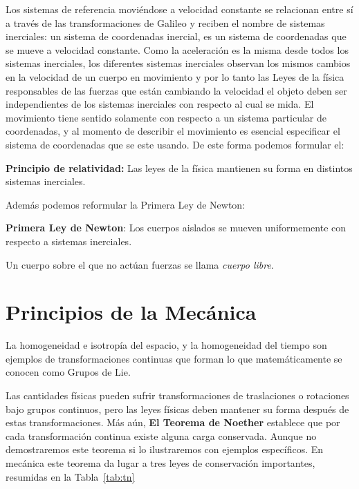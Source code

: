 Los sistemas de referencia moviéndose a velocidad constante se
relacionan entre sí a través de las transformaciones de Galileo y
reciben el nombre de sistemas inerciales: un sistema de coordenadas
inercial, es un sistema de coordenadas que se mueve a velocidad
constante.
Como la aceleración es la misma desde todos los sistemas inerciales,
los diferentes sistemas inerciales observan los mismos cambios en la
velocidad de un cuerpo en movimiento y por lo tanto las Leyes de la
física responsables de las fuerzas que están cambiando la velocidad el
objeto deben ser independientes de los sistemas inerciales con
respecto al cual se mida. 
El movimiento tiene sentido solamente con respecto a un sistema
particular de coordenadas, y al momento de describir el movimiento es
esencial especificar el sistema de coordenadas que se este usando. De
este forma podemos formular el:

\textbf{Principio de relatividad:} Las leyes de la física mantienen su forma en distintos sistemas inerciales.

Además podemos reformular la Primera Ley de Newton:

\textbf{Primera Ley de Newton}: Los cuerpos aislados se mueven
uniformemente con respecto a sistemas inerciales.

Un cuerpo sobre el que no actúan fuerzas se llama \emph{cuerpo libre}.

\section{Principios de la Mecánica}
La homogeneidad e isotropía del espacio, y la homogeneidad del tiempo
son ejemplos de transformaciones continuas que forman lo que
matemáticamente se conocen como Grupos de Lie.


Las cantidades físicas pueden sufrir transformaciones de traslaciones
o rotaciones bajo grupos continuos, pero las leyes físicas deben
mantener su forma después de estas transformaciones. 
Más aún, \textbf{El Teorema de Noether} establece que por cada
transformación continua existe alguna carga conservada. 
Aunque no demostraremos este teorema si lo ilustraremos con ejemplos
específicos. 
En mecánica este teorema da lugar a tres leyes de conservación
importantes, resumidas en la Tabla~\ref{tab:tn}

